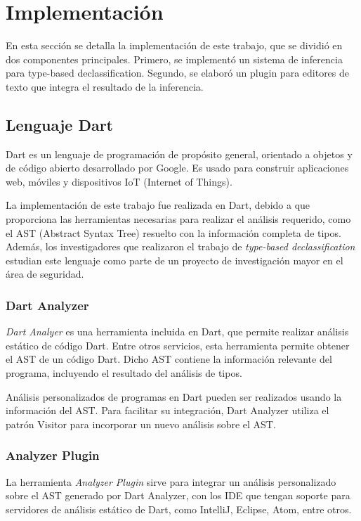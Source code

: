 \chapter{Implementación}
En esta sección se detalla la implementación de este trabajo, que se dividió en dos componentes principales. Primero, se implementó un sistema de inferencia para type-based declassification. Segundo, se elaboró un plugin para editores de texto que integra el resultado de la inferencia.

\section{Lenguaje Dart}
Dart es un lenguaje de programación de propósito general, orientado a objetos y de código abierto desarrollado por Google. Es usado para construir aplicaciones web, móviles y dispositivos IoT (Internet of Things).

La implementación de este trabajo fue realizada en Dart, debido a que proporciona las herramientas necesarias para realizar el análisis requerido, como el AST (Abstract Syntax Tree) resuelto con la información completa de tipos. Además, los investigadores que realizaron el trabajo de \textit{type-based declassification} estudian este lenguaje como parte de un proyecto de investigación mayor en el área de seguridad.

\subsection{Dart Analyzer}
\emph{Dart Analyer} es una herramienta incluida en Dart, que permite realizar análisis estático de código Dart. Entre otros servicios, esta herramienta permite obtener el AST de un código Dart. Dicho AST contiene la información relevante del programa, incluyendo el resultado del análisis de tipos.

Análisis personalizados de programas en Dart pueden ser realizados usando la información del AST. Para facilitar su integración, Dart Analyzer utiliza el patrón Visitor para incorporar un nuevo análisis sobre el AST.

\subsection{Analyzer Plugin}
La herramienta \emph{Analyzer Plugin} sirve para integrar un análisis personalizado sobre el AST generado por Dart Analyzer, con los IDE que tengan soporte para servidores de análisis estático de Dart, como IntelliJ, Eclipse, Atom, entre otros.

